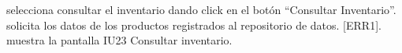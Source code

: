 \begin{UCtrayectoria}{}
		\UCpaso[\UCactor] selecciona consultar el inventario dando click en el botón ``Consultar Inventario''.
		\UCpaso solicita los datos de los productos registrados al repositorio de datos. [ERR1].
		\UCpaso muestra la pantalla IU23 Consultar inventario.
\end{UCtrayectoria}
